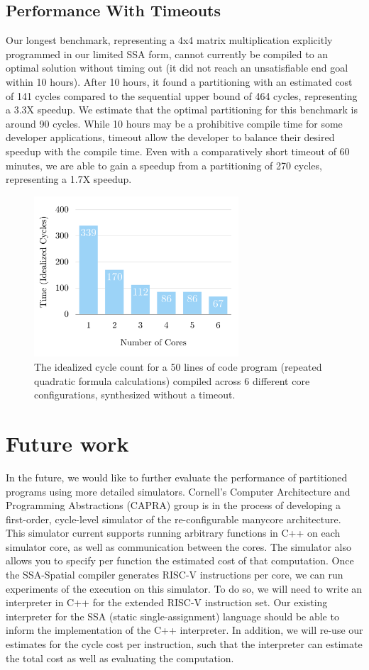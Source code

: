 \documentclass{sig-alternate-05-2015}
\begin{document}
\subsection{Performance With Timeouts}
Our longest benchmark, representing a 4x4 matrix multiplication explicitly programmed in our limited SSA form, cannot currently be compiled to an optimal solution without timing out (it did not reach an unsatisfiable end goal within 10 hours). After 10 hours, it found a partitioning with an estimated cost of 141 cycles compared to the sequential upper bound of 464 cycles, representing a 3.3X speedup. We estimate that the optimal partitioning for this benchmark is around 90 cycles. While 10 hours may be a prohibitive compile time for some developer applications, timeout allow the developer to balance their desired speedup with the compile time. Even with a comparatively short timeout of 60 minutes, we are able to gain a speedup from a partitioning of 270 cycles, representing a 1.7X speedup. 
\begin{figure}
\centering
\includegraphics[width=3in]{eval1.png}
\caption{The idealized cycle count for a 50 lines of code program (repeated quadratic formula calculations) compiled across 6 different core configurations, synthesized without a timeout.}
\label{fig:eval-quad-trice}
\end{figure}

\section{Future work}
In the future, we would like to further evaluate the performance of partitioned programs using more detailed simulators. Cornell's Computer Architecture and Programming Abstractions (CAPRA) group is in the process of developing a first-order, cycle-level simulator of the re-configurable manycore architecture. This simulator current supports running arbitrary functions in C++ on each simulator core, as well as communication between the cores. The simulator also allows you to specify per function the estimated cost of that computation. Once the SSA-Spatial compiler generates RISC-V instructions per core, we can run experiments of the execution on this simulator. To do so, we will need to write an interpreter in C++ for the extended RISC-V instruction set. Our existing interpreter for the SSA (static single-assignment) language should be able to inform the implementation of the C++ interpreter. In addition, we will re-use our estimates for the cycle cost per instruction, such that the interpreter can estimate the total cost as well as evaluating the computation.
\end{document}
